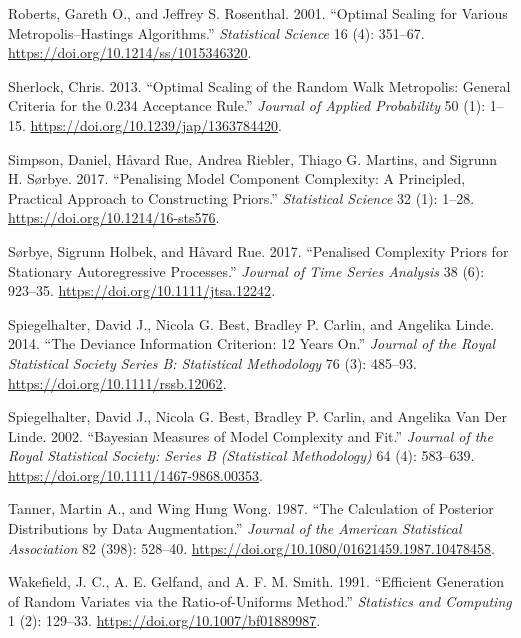 \documentclass[
  11pt,
  letterpaper,
]{scrbook}
\newlength{\cslhangindent}
\newenvironment{CSLReferences}[2] %
 {\begin{list}{}{%
  \setlength{\itemindent}{0pt}
  \setlength{\leftmargin}{0pt}
  \setlength{\parsep}{0pt}
  \ifodd #1
   \setlength{\leftmargin}{\cslhangindent}
   \setlength{\itemindent}{-1\cslhangindent}
  \fi
  \setlength{\itemsep}{#2\baselineskip}}}
 {\end{list}}
\theoremstyle{definition}
\theoremstyle{plain}
\theoremstyle{plain}
\theoremstyle{definition}
\theoremstyle{definition}
\theoremstyle{remark}
\begin{document}
\begin{CSLReferences}{1}{0}
Roberts, Gareth O., and Jeffrey S. Rosenthal. 2001. {``Optimal Scaling
for Various {M}etropolis--{H}astings Algorithms.''} \emph{Statistical
Science} 16 (4): 351--67. \url{https://doi.org/10.1214/ss/1015346320}.

Sherlock, Chris. 2013. {``Optimal Scaling of the Random Walk
{M}etropolis: General Criteria for the 0.234 Acceptance Rule.''}
\emph{Journal of Applied Probability} 50 (1): 1--15.
\url{https://doi.org/10.1239/jap/1363784420}.

Simpson, Daniel, Håvard Rue, Andrea Riebler, Thiago G. Martins, and
Sigrunn H. Sørbye. 2017. {``Penalising Model Component Complexity: A
Principled, Practical Approach to Constructing Priors.''}
\emph{Statistical Science} 32 (1): 1--28.
\url{https://doi.org/10.1214/16-sts576}.

Sørbye, Sigrunn Holbek, and Håvard Rue. 2017. {``Penalised Complexity
Priors for Stationary Autoregressive Processes.''} \emph{Journal of Time
Series Analysis} 38 (6): 923--35.
\url{https://doi.org/10.1111/jtsa.12242}.

Spiegelhalter, David J., Nicola G. Best, Bradley P. Carlin, and Angelika
Linde. 2014. {``The Deviance Information Criterion: 12 Years On.''}
\emph{Journal of the Royal Statistical Society Series B: Statistical
Methodology} 76 (3): 485--93. \url{https://doi.org/10.1111/rssb.12062}.

Spiegelhalter, David J., Nicola G. Best, Bradley P. Carlin, and Angelika
Van Der Linde. 2002. {``Bayesian Measures of Model Complexity and
Fit.''} \emph{Journal of the Royal Statistical Society: Series B
(Statistical Methodology)} 64 (4): 583--639.
\url{https://doi.org/10.1111/1467-9868.00353}.

Tanner, Martin A., and Wing Hung Wong. 1987. {``The Calculation of
Posterior Distributions by Data Augmentation.''} \emph{Journal of the
American Statistical Association} 82 (398): 528--40.
\url{https://doi.org/10.1080/01621459.1987.10478458}.

Wakefield, J. C., A. E. Gelfand, and A. F. M. Smith. 1991. {``Efficient
Generation of Random Variates via the Ratio-of-Uniforms Method.''}
\emph{Statistics and Computing} 1 (2): 129--33.
\url{https://doi.org/10.1007/bf01889987}.


\end{CSLReferences}
\end{document}
